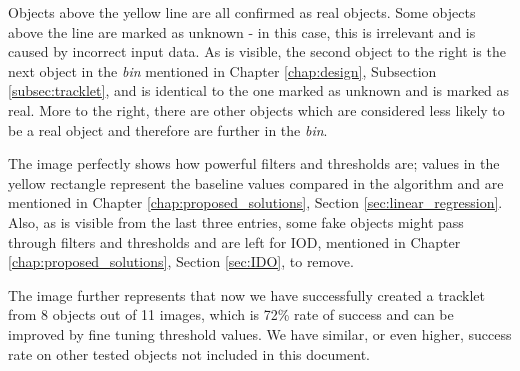 	Objects above the yellow line are all confirmed as real objects. Some objects above the line are marked as unknown - in this case, this is irrelevant and is caused by incorrect input data. As is visible, the second object to the right is the next object in the \emph{bin} mentioned in Chapter \ref{chap:design}, Subsection \ref{subsec:tracklet}, and is identical to the one marked as unknown and is marked as real. More to the right, there are other objects which are considered less likely to be a real object and therefore are further in the \emph{bin}.
	
	The image perfectly shows how powerful filters and thresholds are; values in the yellow rectangle represent the baseline values compared in the algorithm and are mentioned in Chapter \ref{chap:proposed_solutions}, Section \ref{sec:linear_regression}. Also, as is visible from the last three entries, some fake objects might pass through filters and thresholds and are left for IOD, mentioned in Chapter \ref{chap:proposed_solutions}, Section \ref{sec:IDO}, to remove.
	
	The image further represents that now we have successfully created a tracklet from 8 objects out of 11 images, which is 72\% rate of success and can be improved by fine tuning threshold values. We have similar, or even higher, success rate on other tested objects not included in this document.